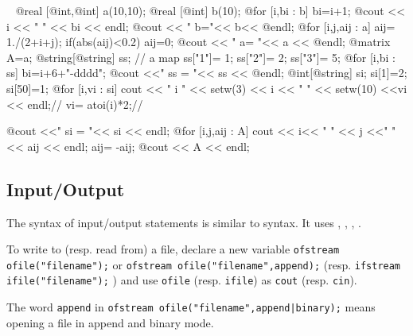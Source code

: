 \documentclass[a4paper,twoside,12pt]{book}
\def\setS#1{#1\label{sec:#1}}
\begin{document}
 \begin{example}~
\bFF
@real [@int,@int] a(10,10);
@real [@int] b(10);
@for [i,bi : b] {bi=i+1; @cout << i << " " << bi << endl;}
@cout << " b="<< b<< @endl;  
@for [i,j,aij : a] 
{
   aij= 1./(2+i+j);
   if(abs(aij)<0.2) aij=0;
}
@cout << " a= "<< a << @endl; 
@matrix A=a;
@string[@string] ss; // a map
ss["1"]= 1;
ss["2"]= 2;
ss["3"]= 5;
@for [i,bi : ss] 
    bi=i+6+"-dddd"; 
@cout <<" ss = "<< ss << @endl;
@int[@string] si;
si[1]=2;
si[50]=1;
@for [i,vi : si]
   {
   cout << " i " << setw(3) << i << " " << setw(10) <<vi << endl;// 
    vi= atoi(i)*2;// 
    }

@cout <<" si = "<< si << endl;
@for [i,j,aij : A]
{
    cout << i<< " " << j <<" " <<  aij << endl; 
    aij= -aij;
}
@cout << A << endl; 
\eFF
\end{example}



\subsection{\setS{Input/Output}}

The syntax of input/output statements is similar  to \Cpp syntax. It
uses , , , \ttCC{<<,>>}.

To write  to (resp. read from)  a file, \index{$<<$} \index{$>>$}
declare a new variable \texttt{ofstream ofile("filename");} or \texttt{ofstream ofile("filename",append);} (resp.
\texttt{ifstream ifile("filename");} ) and use \texttt{ofile}  (resp. \texttt{ifile})
as \texttt{cout} (resp. \texttt{cin}).

The word \texttt{append} in  \texttt{ofstream ofile("filename",append|binary);}
 means opening a file in append and binary mode.
\end{document}
